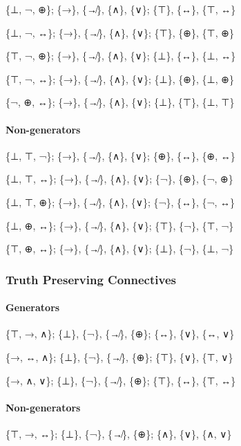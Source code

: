 \{⊥, ¬, ⊕\}; \{→\}, \{↛\}, \{∧\}, \{∨\}; \{⊤\}, \{↔\}, \{⊤, ↔\}

\{⊥, ¬, ↔\}; \{→\}, \{↛\}, \{∧\}, \{∨\}; \{⊤\}, \{⊕\}, \{⊤, ⊕\}

\{⊤, ¬, ⊕\}; \{→\}, \{↛\}, \{∧\}, \{∨\}; \{⊥\}, \{↔\}, \{⊥, ↔\}

\{⊤, ¬, ↔\}; \{→\}, \{↛\}, \{∧\}, \{∨\}; \{⊥\}, \{⊕\}, \{⊥, ⊕\}

\{¬, ⊕, ↔\}; \{→\}, \{↛\}, \{∧\}, \{∨\}; \{⊥\}, \{⊤\}, \{⊥, ⊤\}

\hypertarget{non-generators-1}{%
\paragraph{Non-generators}\label{non-generators-1}}

\{⊥, ⊤, ¬\}; \{→\}, \{↛\}, \{∧\}, \{∨\}; \{⊕\}, \{↔\}, \{⊕, ↔\}

\{⊥, ⊤, ↔\}; \{→\}, \{↛\}, \{∧\}, \{∨\}; \{¬\}, \{⊕\}, \{¬, ⊕\}

\{⊥, ⊤, ⊕\}; \{→\}, \{↛\}, \{∧\}, \{∨\}; \{¬\}, \{↔\}, \{¬, ↔\}

\{⊥, ⊕, ↔\}; \{→\}, \{↛\}, \{∧\}, \{∨\}; \{⊤\}, \{¬\}, \{⊤, ¬\}

\{⊤, ⊕, ↔\}; \{→\}, \{↛\}, \{∧\}, \{∨\}; \{⊥\}, \{¬\}, \{⊥, ¬\}

\hypertarget{truth-preserving-connectives}{%
\subsubsection{Truth Preserving
Connectives}\label{truth-preserving-connectives}}

\hypertarget{generators-2}{%
\paragraph{Generators}\label{generators-2}}

\{⊤, →, ∧\}; \{⊥\}, \{¬\}, \{↛\}, \{⊕\}; \{↔\}, \{∨\}, \{↔, ∨\}

\{→, ↔, ∧\}; \{⊥\}, \{¬\}, \{↛\}, \{⊕\}; \{⊤\}, \{∨\}, \{⊤, ∨\}

\{→, ∧, ∨\}; \{⊥\}, \{¬\}, \{↛\}, \{⊕\}; \{⊤\}, \{↔\}, \{⊤, ↔\}

\hypertarget{non-generators-2}{%
\paragraph{Non-generators}\label{non-generators-2}}

\{⊤, →, ↔\}; \{⊥\}, \{¬\}, \{↛\}, \{⊕\}; \{∧\}, \{∨\}, \{∧, ∨\}

